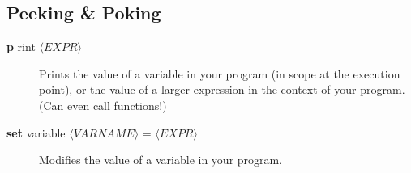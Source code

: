 \documentclass[11pt]{article}
\newcommand\dbc[2]{{%
  \sffamily\upshape\mdseries
  \textbf{\textcolor{Abbreviation} {#1}}%
  #2}}
\newcommand\abw[1]{$\langle\mathit{#1}\rangle$}
\begin{document}
\begin{multicols}{2}
\subsection*{Peeking \& Poking}
\begin{description}

  \item[\dbc{p}{rint} \abw{EXPR}] Prints the value of a variable in your
    program (in scope at the execution point), or the value of a larger
    expression in the context of your program. (Can even call
    functions!)

  \item[\dbc{set}{ variable} \abw{VARNAME} = \abw{EXPR}] Modifies the
    value of a variable in your program.

\end{description}

\end{multicols}
\end{document}
